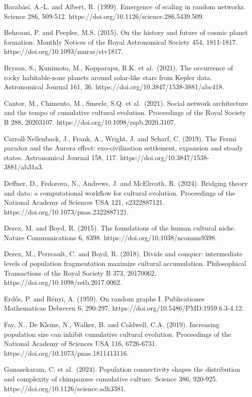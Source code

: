 \documentclass[
  10pt,a4paper,
]{article}
\begin{document}
Barabási, A.-L. and Albert, R. (1999). Emergence of scaling in random
networks. Science 286, 509-512.
https://doi.org/10.1126/science.286.5439.509.

Behroozi, P. and Peeples, M.S. (2015). On the history and future of
cosmic planet formation. Monthly Notices of the Royal Astronomical
Society 454, 1811-1817. https://doi.org/10.1093/mnras/stv1817.

Bryson, S., Kunimoto, M., Kopparapu, R.K. et al.~(2021). The occurrence
of rocky habitable-zone planets around solar-like stars from Kepler
data. Astronomical Journal 161, 36.
https://doi.org/10.3847/1538-3881/abc418.

Cantor, M., Chimento, M., Smeele, S.Q. et al.~(2021). Social network
architecture and the tempo of cumulative cultural evolution. Proceedings
of the Royal Society B 288, 20203107.
https://doi.org/10.1098/rspb.2020.3107.

Carroll-Nellenback, J., Frank, A., Wright, J. and Scharf, C. (2019). The
Fermi paradox and the Aurora effect: exo-civilization settlement,
expansion and steady states. Astronomical Journal 158, 117.
https://doi.org/10.3847/1538-3881/ab31a3.

Deffner, D., Fedorova, N., Andrews, J. and McElreath, R. (2024).
Bridging theory and data: a computational workflow for cultural
evolution. Proceedings of the National Academy of Sciences USA 121,
e2322887121. https://doi.org/10.1073/pnas.2322887121.

Derex, M. and Boyd, R. (2015). The foundations of the human cultural
niche. Nature Communications 6, 8398.
https://doi.org/10.1038/ncomms9398.

Derex, M., Perreault, C. and Boyd, R. (2018). Divide and conquer:
intermediate levels of population fragmentation maximize cultural
accumulation. Philosophical Transactions of the Royal Society B 373,
20170062. https://doi.org/10.1098/rstb.2017.0062.

Erdős, P. and Rényi, A. (1959). On random graphs I. Publicationes
Mathematicae Debrecen 6, 290-297.
https://doi.org/10.5486/PMD.1959.6.3-4.12.

Fay, N., De Kleine, N., Walker, B. and Caldwell, C.A. (2019). Increasing
population size can inhibit cumulative cultural evolution. Proceedings
of the National Academy of Sciences USA 116, 6726-6731.
https://doi.org/10.1073/pnas.1811413116.

Gunasekaram, C. et al.~(2024). Population connectivity shapes the
distribution and complexity of chimpanzee cumulative culture. Science
386, 920-925. https://doi.org/10.1126/science.adk3381.
\end{document}
